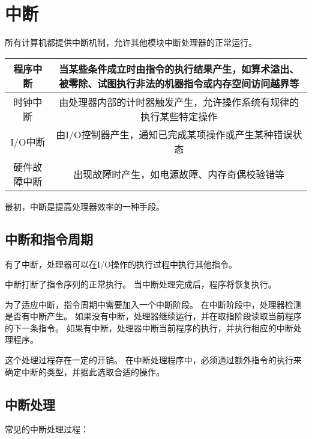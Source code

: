 
\section{中断}
{
    所有计算机都提供中断机制，允许其他模块中断处理器的正常运行。

    \begin{table}[htb]
        \begin{tabular}{c|c}
            \hline
            程序中断 & 当某些条件成立时由指令的执行结果产生，如算术溢出、被零除、试图执行非法的机器指令或内存空间访问越界等 \\
            \hline
            时钟中断 & 由处理器内部的计时器触发产生，允许操作系统有规律的执行某些特定操作 \\
            \hline
            I/O中断 & 由I/O控制器产生，通知已完成某项操作或产生某种错误状态 \\
            \hline
            硬件故障中断 & 出现故障时产生，如电源故障、内存奇偶校验错等 \\
            \hline
        \end{tabular}
    \end{table}

    最初，中断是提高处理器效率的一种手段。

    \subsection{中断和指令周期}
    {
        有了中断，处理器可以在I/O操作的执行过程中执行其他指令。

        中断打断了指令序列的正常执行。
        当中断处理完成后，程序将恢复执行。

        为了适应中断，指令周期中需要加入一个中断阶段。
        在中断阶段中，处理器检测是否有中断产生。
        如果没有中断，处理器继续运行，并在取指阶段读取当前程序的下一条指令。
        如果有中断，处理器中断当前程序的执行，并执行相应的中断处理程序。

        这个处理过程存在一定的开销。
        在中断处理程序中，必须通过额外指令的执行来确定中断的类型，并据此选取合适的操作。
    }

    \subsection{中断处理}
    {
        常见的中断处理过程：

}}
